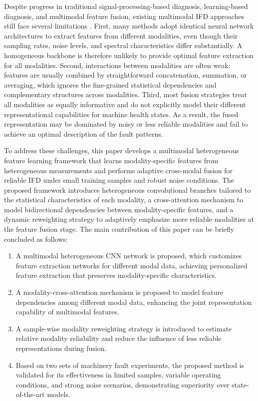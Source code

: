 \documentclass[a4paper]{cas-sc}
\begin{document}
Despite progress in traditional signal-processing-based diagnosis, learning-based diagnosis, and multimodal feature fusion, existing multimodal IFD approaches still face several limitations \cite{4,5}. First, many methods adopt identical neural network architectures to extract features from different modalities, even though their sampling rates, noise levels, and spectral characteristics differ substantially. A homogeneous backbone is therefore unlikely to provide optimal feature extraction for all modalities. Second, interactions between modalities are often weak: features are usually combined by straightforward concatenation, summation, or averaging, which ignores the fine-grained statistical dependencies and complementary structures across modalities. Third, most fusion strategies treat all modalities as equally informative and do not explicitly model their different representational capabilities for machine health states. As a result, the fused representation may be dominated by noisy or less reliable modalities and fail to achieve an optimal description of the fault patterns.

To address these challenges, this paper develops a multimodal heterogeneous feature learning framework that learns modality-specific features from heterogeneous measurements and performs adaptive cross-modal fusion for reliable IFD under small training samples and robust noise conditions. The proposed framework introduces heterogeneous convolutional branches tailored to the statistical characteristics of each modality, a cross-attention mechanism to model bidirectional dependencies between modality-specific features, and a dynamic reweighting strategy to adaptively emphasize more reliable modalities at the feature fusion stage. The main contribution of this paper can be briefly concluded as follows:

\begin{enumerate}

  \item A multimodal heterogeneous CNN network is proposed, which customizes feature extraction networks for different modal data, achieving personalized feature extraction that preserves modality-specific characteristics.
  \item A modality-cross-attention mechanism is proposed to model feature dependencies among different modal data, enhancing the joint representation capability of multimodal features.
  \item A sample-wise modality reweighting strategy is introduced to estimate relative modality reliability and reduce the influence of less reliable representations during fusion.
  \item Based on two sets of machinery fault experiments, the proposed method is validated for its effectiveness in limited samples, variable operating conditions, and strong noise scenarios, demonstrating superiority over state-of-the-art models.
  
\end{enumerate}
\end{document}
